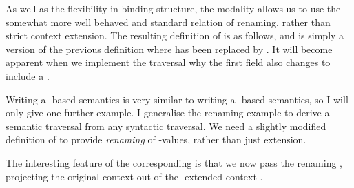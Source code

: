 
As well as the flexibility in binding structure, the \AgdaFunction{$\Box$}
modality allows us to use the somewhat more well behaved and standard
relation of renaming, rather than strict context extension.
The resulting definition of  is as follows, and is
simply a version of the previous definition where \AgdaFunction{$\bigcirc$}
has been replaced by \AgdaFunction{$\Box$}.
It will become apparent when we implement the traversal  why
the first field also changes to include a \AgdaFunction{$\Box$}.


Writing a \AgdaFunction{$\Box$}-based semantics is very similar to writing a
\AgdaFunction{$\bigcirc$}-based semantics, so I will only give one further
example.
I generalise the renaming example to derive a semantic traversal from any
syntactic traversal.
We need a slightly modified definition of  to provide
\emph{renaming} of \AgdaBound{$\V$}-values, rather than just extension.


The interesting feature of the corresponding  is that
we now pass  the renaming , projecting
the original context \AgdaBound{$\Gamma$} out of the
-extended context
.


